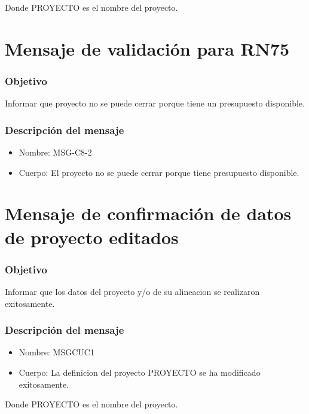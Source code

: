 Donde PROYECTO es el nombre del proyecto.

\section{Mensaje de validación para RN75} \label{MSG-C8-2}
\subsubsection{Objetivo}
Informar que proyecto no se puede cerrar porque tiene un presupuesto disponible.
\subsubsection{Descripción del mensaje}
\begin{itemize}
\item Nombre: MSG-C8-2
\item Cuerpo: El proyecto no se puede cerrar porque tiene presupuesto disponible.
\end{itemize}

\section{Mensaje de confirmación de datos de proyecto editados} \label{MSGCUC1}
\subsubsection{Objetivo}
Informar que los datos del proyecto y/o de su alineacion se realizaron exitosamente.
\subsubsection{Descripción del mensaje}
\begin{itemize}
\item Nombre: MSGCUC1
\item Cuerpo: La definicion del proyecto PROYECTO se ha modificado exitosamente.
\end{itemize}

Donde PROYECTO es el nombre del proyecto.
